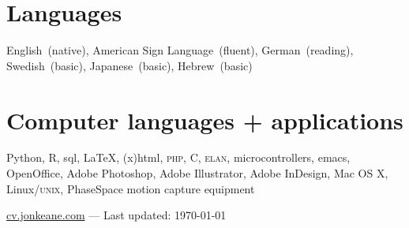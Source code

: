 \documentclass[10pt, letterpaper]{article}
\begin{document}
\section*{Languages}
\label{sec:languages}
English~(native), American Sign Language~(fluent), German~(reading), Swedish~(basic), Japanese~(basic), Hebrew~(basic)

\section*{Computer languages + applications}
\label{sec:computer}
Python, R, {\sc sql}, \LaTeX, {\sc (x)html}, \textsc{php}, C, \textsc{elan}, microcontrollers, emacs, OpenOffice, Adobe Photoshop, Adobe Illustrator, Adobe InDesign, Mac OS X, Linux/\textsc{unix}, PhaseSpace motion capture equipment

\vfill{}
\hrulefill
\begin{center}
{\footnotesize \href{http://cv.jonkeane.com}{cv.jonkeane.com} — Last updated: \isodate\today}
\end{center}
\end{document}
